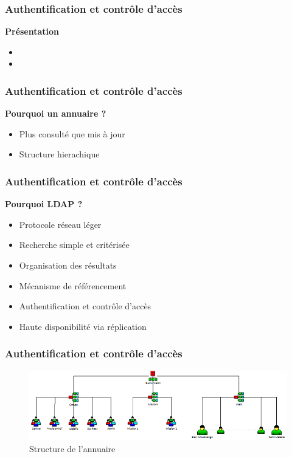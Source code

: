 \begin{frame}
  \frametitle{Authentification et contrôle d'accès}
  \begin{block}{\textbf{ Présentation }}
  \begin{itemize}
  \item 
  \item 
  \end{itemize}
  \end{block}
\end{frame}

\begin{frame}
  \frametitle{Authentification et contrôle d'accès}
  \begin{block}{\textbf{Pourquoi un annuaire ? }}
  \begin{itemize}
  \item Plus consulté que mis à jour
  \item Structure hierachique 
  \end{itemize} 
  \end{block}
\end{frame}

\begin{frame}
  \frametitle{Authentification et contrôle d'accès}
  \begin{block}{\textbf{Pourquoi LDAP ? }}
  \begin{itemize}
  \item Protocole réseau léger
  \item Recherche simple et critérisée
  \item Organisation des résultats
  \item Mécanisme de référencement
  \item Authentification et contrôle d'accès
  \item Haute disponibilité via réplication
  \end{itemize}
  \end{block}
\end{frame}

  \frametitle{Authentification et contrôle d'accès}
  \begin{figure}[htbp]
	  \centering
	  \includegraphics[scale=0.6]{Images/SchemaLDAP.png}
	  \caption{Structure de l'annuaire}
	  \label{SchemaLDAP}
  \end{figure}
 
